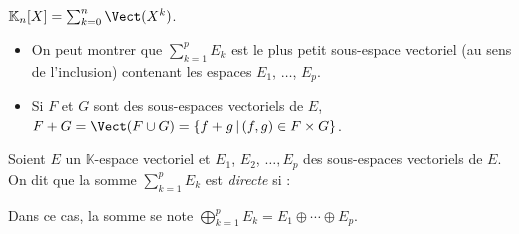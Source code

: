 \documentclass[french,11pt,twoside]{VcCours}
\newcommand{\Sum}[2]{\sum_{#1}^{#2}}
\begin{document}
\begin{Demonstration}{}

\vspace{6cm}


\end{Demonstration}

\begin{Exemple} $\mathbb{K}_n[X] = \Sum{k=0}{n} \Vect(X^k)$.
\end{Exemple}

\begin{Remarques}{}
\begin{itemize} 
\item On peut montrer que $\Sum{k=1}{p} E_k$ est le plus petit sous-espace vectoriel (au sens de l'inclusion) contenant les espaces $E_1$, $\ldots$, $E_p$. 
\item Si $F$ et $G$ sont des sous-espaces vectoriels de $E$, $F+G = \Vect(F \cup G) = \lbrace f+g \, \vert \, (f,g) \in F \times G\rbrace$.
\end{itemize}
\end{Remarques}{}

\begin{Definition}{} 
Soient $E$ un $\mathbb{K}$-espace vectoriel et $E_1$, $E_2$, $\ldots, E_p$ des sous-espaces vectoriels de $E$. On dit que la somme $\Sum{k=1}{p} E_k$ est \emph{directe} si :

\vspace{1cm}
%
Dans ce cas, la somme se note $\bigoplus_{k=1}^p E_k = E_1 \oplus \cdots \oplus E_p$.
\end{Definition}
\end{document}
